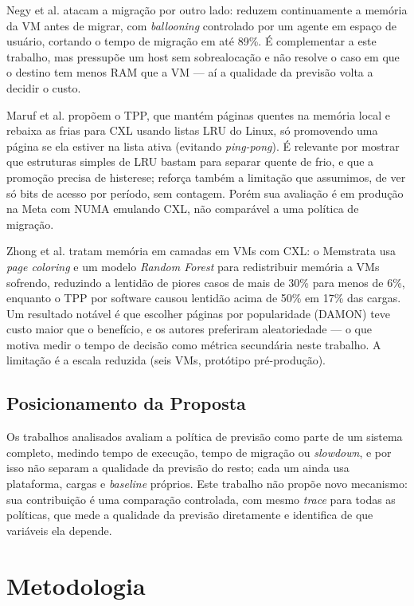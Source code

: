 \documentclass[12pt]{article}
\begin{document}
Negy et al. \cite{negy2024ballooning} atacam a migração por outro lado: reduzem continuamente a memória da VM antes de migrar, com \textit{ballooning} controlado por um agente em espaço de usuário, cortando o tempo de migração em até 89\%. É complementar a este trabalho, mas pressupõe um host sem sobrealocação e não resolve o caso em que o destino tem menos RAM que a VM — aí a qualidade da previsão volta a decidir o custo.

Maruf et al. \cite{maruf2023tpp} propõem o TPP, que mantém páginas quentes na memória local e rebaixa as frias para CXL usando listas LRU do Linux, só promovendo uma página se ela estiver na lista ativa (evitando \textit{ping-pong}). É relevante por mostrar que estruturas simples de LRU bastam para separar quente de frio, e que a promoção precisa de histerese; reforça também a limitação que assumimos, de ver só bits de acesso por período, sem contagem. Porém sua avaliação é em produção na Meta com NUMA emulando CXL, não comparável a uma política de migração.

Zhong et al. \cite{zhong2024managing} tratam memória em camadas em VMs com CXL: o Memstrata usa \textit{page coloring} e um modelo \textit{Random Forest} para redistribuir memória a VMs sofrendo, reduzindo a lentidão de piores casos de mais de 30\% para menos de 6\%, enquanto o TPP por software causou lentidão acima de 50\% em 17\% das cargas. Um resultado notável é que escolher páginas por popularidade (DAMON) teve custo maior que o benefício, e os autores preferiram aleatoriedade — o que motiva medir o tempo de decisão como métrica secundária neste trabalho. A limitação é a escala reduzida (seis VMs, protótipo pré-produção).

\subsection{Posicionamento da Proposta}

Os trabalhos analisados avaliam a política de previsão como parte de um sistema completo, medindo tempo de execução, tempo de migração ou \textit{slowdown}, e por isso não separam a qualidade da previsão do resto; cada um ainda usa plataforma, cargas e \textit{baseline} próprios. Este trabalho não propõe novo mecanismo: sua contribuição é uma comparação controlada, com mesmo \textit{trace} para todas as políticas, que mede a qualidade da previsão diretamente e identifica de que variáveis ela depende.

\section{Metodologia}
\end{document}
